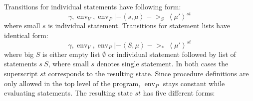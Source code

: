 \documentclass[a4paper, 10pt, draft]{report}
\begin{document}
Transitions for individual statements have following form: 
\[
  \gamma, \operatorname{env}_V, \operatorname{env}_P |- \left\langle
    s, \mu
  \right\rangle ->_S\ 
  \left\langle
    \mu'
  \right\rangle ^{st}
\]
where small $s$ is individual statement. 
Transitions for statement lists have identical form:
\[
  \gamma, \operatorname{env}_V, \operatorname{env}_P |- \left\langle
    S, \mu
  \right\rangle ->_{*}\ 
  \left\langle
    \mu'
  \right\rangle ^{st}
\]
where big $S$ is either empty list $\emptyset$ or individual statement followed
by list of statements $s\ S$, where small $s$ denotes single statement.  In
both cases the superscript $st$ corresponds to the resulting state. Since
procedure definitions are only allowed in the top level of the program,
$\operatorname{env}_P$ stays constant while evaluating statements. The
resulting state $st$ has five different forms:
\end{document}
